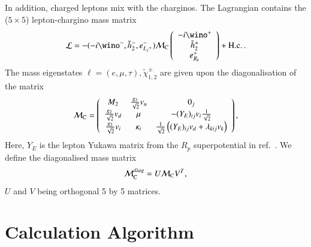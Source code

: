 \documentclass[final,3p,times,pdflatex]{elsarticle}
\begin{document}
In addition,  charged leptons mix with the charginos. The Lagrangian
contains the ($5 \times 5$) lepton-chargino mass matrix
\begin{eqnarray}
{\cal L}= - ( -i \wino^-, \tilde{h}_2^-, e_{L_j}^-,
)
{\cal M}_{\rm C} \left ( \begin{array}{c}
 -i \wino^+\\ \tilde{h}_2^+ \\ e_{R_k}^+ \\
 \end{array} \right ) + {\rm H.c.}\,.
\end{eqnarray}
The mass eigenstates $\ell=(e,\mu,\tau), \tilde{\chi}^\pm_{1,2}$
are given upon the diagonalisation of the matrix
\begin{eqnarray}
{\cal M}_{\rm C} = \left ( \begin{array}{ccc}
M_2  & \frac{g_2}{\sqrt{2}}v_u & 0_j  \\
 \frac{g_2}{\sqrt{2}}v_d  & \mu & -(Y_E)_{ij}v_i\frac{1}{\sqrt{2}} \\
\frac{g_2}{\sqrt{2}}v_i  & \kappa_i & \frac{1}{\sqrt{2}}\left((Y_E)_{ij} v_d+\lambda_{kij}v_k\right)\\
 \end{array}
\right ) , \label{chargino}
\end{eqnarray}
Here, $Y_E$ is the lepton Yukawa matrix from the $R_p$
superpotential in ref.~\cite{Allanach:2001kg}. We define the diagonalised mass
matrix 
\begin{eqnarray}
{\cal M}^{diag}_{\rm C}= U {\cal M}_{\rm C} V^T, \label{diagUV}
\end{eqnarray}
$U$ and $V$ being orthogonal 5 by 5 matrices. 

\section{Calculation Algorithm \label{sec:calculation}}
\end{document}
